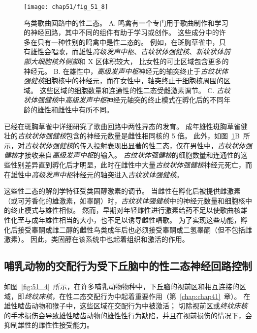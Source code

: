 \begin{figure}[htbp]
	\centering
	\texttt{[image: chap51/fig\_51\_8]}
	\caption{鸟类歌曲回路中的性二态。
		A. 鸣禽有一个专门用于歌曲制作和学习的神经回路，其中不同的组件有助于学习或创作。
		这些成分中的许多在只有一种性别的鸣禽中是性二态的。
		例如，在斑胸草雀中，只有雄性会唱歌，而雄性\textit{高级发声中枢}、\textit{古纹状体强健核}、\textit{新纹状体前部大细胞核外侧部}和 X 区体积较大， 比女性的可比区域包含更多的神经元\cite{brainard2002songbirds}。
		B. 在雄性中，\textit{高级发声中枢}神经元的轴突终止于\textit{古纹状体强健核}细胞核中的神经元，而在女性中，轴突终止于细胞核周围的区域。
		这些区域的细胞数量和连通性的性二态受雌激素调节\cite{morris2004sexual}。
		C. \textit{古纹状体强健核}中\textit{高级发声中枢}神经元轴突的终止模式在孵化后的不同年龄的雄性和雌性中有所不同\cite{konishi1985neuronal}。 }
	\label{fig:51_8}
\end{figure}


已经在斑胸草雀中详细研究了歌曲回路中两性异态的发育。
成年雄性斑胸草雀健壮的\textit{古纹状体强健核}包含的神经元数量是雌性相同核的 5 倍。
此外，如图~\ref{fig:51_8}B~所示，对\textit{古纹状体强健核}的传入投射表现出显著的性二态，仅在男性中，\textit{古纹状体强健核}才接收来自\textit{高级发声中枢}的输入。
\textit{古纹状体强健核}的细胞数量和连通性的这些性别差异直到孵化后才明显，此时在雌性中大量\textit{古纹状体强健核}神经元死亡，而在雄性中\textit{高级发声中枢}神经元的轴突进入\textit{古纹状体强健核}。


这些性二态的解剖学特征受类固醇激素的调节。
当雌性在孵化后被提供雌激素（或可芳香化的雄激素，如睾酮）时，\textit{古纹状体强健核}中的神经元数量和细胞核中的终止模式与雄性相似。
然而，早期对年轻雌性进行激素给药不足以使歌曲核雄性化至与成年雄性相当的大小，也不足以诱导雌性唱歌。
为了实现这些功能，孵化后接受睾酮或雌二醇的雌性鸟类成年后也必须接受睾酮或二氢睾酮（但不包括雌激素）。
因此，类固醇在该系统中也起着组织和激活的作用。



\subsection{哺乳动物的交配行为受下丘脑中的性二态神经回路控制}

如图~\ref{fig:51_4}~所示，在许多哺乳动物物种中，下丘脑的视前区和相互连接的区域，即\textit{终纹床核}，在性二态交配行为中起着重要作用（第~\ref{chap:chap41}~章）。
在雄性啮齿动物和猴子中，这些区域在交配行为中被激活；
切除视前区或\textit{终纹床核}的手术损伤会导致雄性啮齿动物的雄性性行为缺陷，并且在视前损伤的情况下，会抑制雄性的雌性性接受能力。


